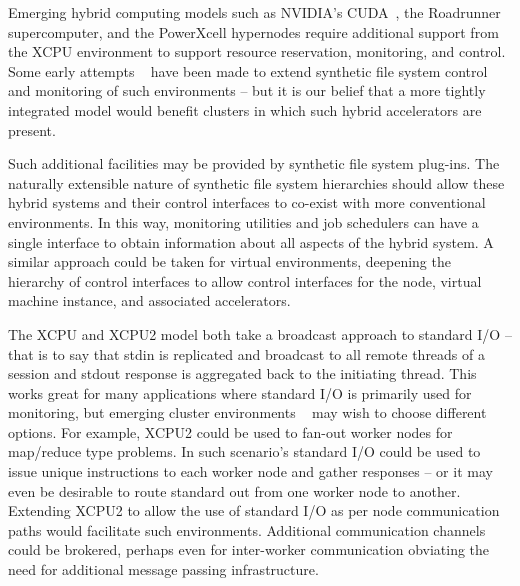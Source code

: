 %
%

Emerging hybrid computing models such as NVIDIA's 
CUDA~\cite{cuda}, the Roadrunner supercomputer, and the PowerXcell hypernodes
require additional support from the XCPU environment to support resource 
reservation, monitoring, and control.  Some early attempts ~\cite{cellfs} have been
made to extend synthetic file system control and monitoring of such environments
-- but it is our belief that a more tightly integrated model would benefit clusters in
which such hybrid accelerators are present.

Such additional facilities may be provided by synthetic file system plug-ins.  The
naturally extensible nature of synthetic file system hierarchies should allow these
hybrid systems and their control interfaces to co-exist with more conventional
environments.  In this way, monitoring utilities and job schedulers can have a
single interface to obtain information about all aspects of the hybrid system.  A
similar approach could be taken for virtual environments, deepening the hierarchy
of control interfaces to allow control interfaces for the node, virtual  machine instance,
and associated accelerators.

The XCPU and XCPU2 model both take a broadcast approach to standard I/O -- 
that is to say that stdin is replicated and broadcast to all remote threads of a 
session and stdout response is aggregated back to the initiating thread.
This works great for many applications where standard I/O is primarily used
for monitoring, but emerging cluster environments ~\cite{push} may wish to
choose different options.  For example, XCPU2 could be used to fan-out
worker nodes for map/reduce type problems.  In such scenario's standard I/O
could be used to issue unique instructions to each worker node and gather 
responses -- or it may even be desirable to route standard out from one worker
node to another.  Extending XCPU2 to allow the use of standard I/O as per node
communication paths would facilitate such environments.   Additional
communication channels could be brokered, perhaps even for inter-worker
communication obviating the need for additional message passing infrastructure.

